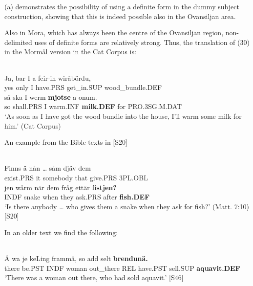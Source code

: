 	(a) demonstrates the possibility of using a definite form in the dummy subject construction, showing that this is indeed possible also in the Ovansiljan area. 


Also in Mora, which has always been the centre of the Ovansiljan region, non-delimited uses of definite forms are relatively strong. Thus, the translation of (30) in the Mormål version in the Cat Corpus is:


\ea \label{} 
\\
\gll Ja,  bar  I  a  feir-in  wiråbördu,\\
yes  only  I  have.PRS  get\_in.SUP  wood\_bundle.DEF\\
\gll så  ska  I  werm  \textbf{mjotse} a  onum.\\
so  shall.PRS  I  warm.INF  \textbf{milk.DEF} for  PRO.3SG.M.DAT\\
\glt ‘As soon as I have got the wood bundle into the house, I’ll warm some milk for him.’ (Cat Corpus)

\z

An example from the Bible texts in [S20]\textstyleLinguisticExample{:}


\ea \label{} 
\\
\gll Finns  ä  nån  …  såm  djäv  dem\\
exist.PRS  it  somebody    that  give.PRS  3PL.OBL\\
\gll jen  wårm  när  dem  fråg  ettär  \textbf{fistjen?}\\
INDF  snake  when  they  ask.PRS  after  \textbf{fish.DEF}\\
\glt ‘Is there anybody … who gives them a snake when they ask for fish?’ (Matt. 7:10) [S20]

\z

In an older text we find the following:


\ea \label{} 
\\
\gll Ä  wa  je  keLing  frammä,  so  add  selt  \textbf{brendunä.}\\
there  be.PST  INDF  woman  out\_there  REL  have.PST  sell.SUP  \textbf{aquavit.DEF}\\
\glt ‘There was a woman out there, who had sold aquavit.’ [S46]


